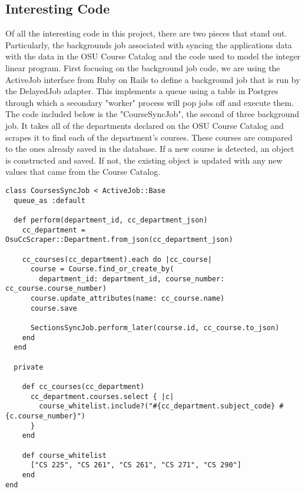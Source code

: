 \subsection{Interesting Code}

Of all the interesting code in this project, there are two pieces that stand out.
Particularly, the backgrounds job associated with syncing the applications data with the data in the OSU Course Catalog and the code used to model the integer linear program.
First focusing on the background job code, we are using the ActiveJob interface from Ruby on Rails to define a background job that is run by the DelayedJob adapter.
This implements a queue using a table in Postgres through which a secondary "worker" process will pop jobs off and execute them.
The code included below is the "CourseSyncJob", the second of three background job.
It takes all of the departments declared on the OSU Course Catalog and scrapes it to find each of the department's courses.
These courses are compared to the ones already saved in the database.
If a new course is detected, an object is constructed and saved.
If not, the existing object is updated with any new values that came from the Course Catalog.

\begin{lstlisting}
class CoursesSyncJob < ActiveJob::Base
  queue_as :default

  def perform(department_id, cc_department_json)
    cc_department = OsuCcScraper::Department.from_json(cc_department_json)

    cc_courses(cc_department).each do |cc_course|
      course = Course.find_or_create_by(
        department_id: department_id, course_number: cc_course.course_number)
      course.update_attributes(name: cc_course.name)
      course.save

      SectionsSyncJob.perform_later(course.id, cc_course.to_json)
    end
  end

  private

    def cc_courses(cc_department)
      cc_department.courses.select { |c|
        course_whitelist.include?("#{cc_department.subject_code} #{c.course_number}")
      }
    end

    def course_whitelist
      ["CS 225", "CS 261", "CS 261", "CS 271", "CS 290"]
    end
end
\end{lstlisting}

